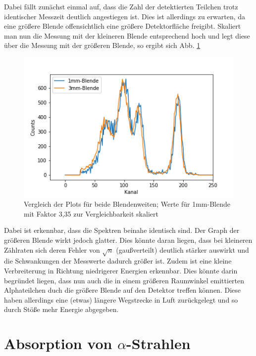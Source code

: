 Dabei fällt zunächst einmal auf, dass die Zahl der detektierten Teilchen trotz identischer Messzeit deutlich angestiegen ist. Dies ist 
allerdings zu erwarten, da eine größere Blende offensichtlich eine größere Detektorfläche freigibt. Skaliert man nun die Messung 
mit der kleineren Blende entsprechend hoch und legt diese über die Messung mit der größeren Blende, so ergibt sich Abb. 
\ref{bild:blendebeide}

\begin{figure}[h]
    \centering
    \includegraphics[scale=0.75]{Bilder/blendebeide.png}
    \caption{Vergleich der Plots für beide Blendenweiten; Werte für 1mm-Blende mit Faktor 3,35 zur Vergleichbarkeit skaliert}
    \label{bild:blendebeide}
\end{figure}

Dabei ist erkennbar, dass die Spektren beinahe identisch sind. Der Graph der größeren Blende wirkt jedoch glatter. Dies könnte 
daran liegen, dass bei kleineren Zählraten sich deren Fehler von $\sqrt{n}$ (gaußverteilt) deutlich stärker auswirkt und die Schwankungen der 
Messwerte dadurch größer ist. Zudem ist eine kleine Verbreiterung in Richtung niedrigerer Energien erkennbar. Dies könnte darin begründet 
liegen, dass nun auch die in einem größeren Raumwinkel emittierten Alphateilchen duch die größere Blende auf den Detektor treffen können. 
Diese haben allerdings eine (etwas) längere Wegstrecke in Luft zurückgelegt und so durch Stöße mehr Energie abgegeben.





\section{Absorption von $\alpha$-Strahlen}
\label{subs:abs}


